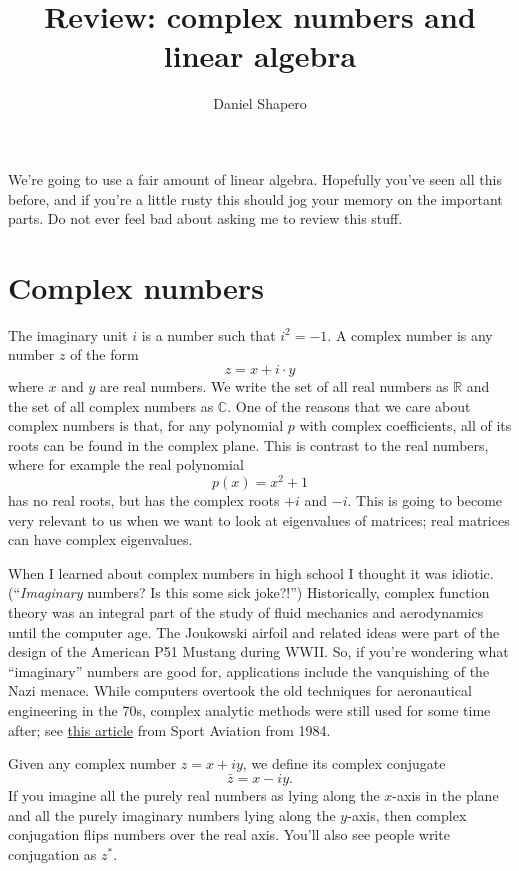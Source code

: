 \documentclass{article}
\title{Review: complex numbers and linear algebra}
\author{Daniel Shapero}
\date{}
\theoremstyle{definition}
\theoremstyle{plain}
\begin{document}
\maketitle

We're going to use a fair amount of linear algebra.
Hopefully you've seen all this before, and if you're a little rusty this should jog your memory on the important parts.
Do not ever feel bad about asking me to review this stuff.


\section{Complex numbers}

The imaginary unit $i$ is a number such that $i^2 = -1$.
A complex number is any number $z$ of the form
\begin{equation}
    z = x + i\cdot y
\end{equation}
where $x$ and $y$ are real numbers.
We write the set of all real numbers as $\mathbb{R}$ and the set of all complex numbers as $\mathbb{C}$.
One of the reasons that we care about complex numbers is that, for any polynomial $p$ with complex coefficients, all of its roots can be found in the complex plane.
This is contrast to the real numbers, where for example the real polynomial
\begin{equation}
    p(x) = x^2 + 1
\end{equation}
has no real roots, but has the complex roots $+i$ and $-i$.
This is going to become very relevant to us when we want to look at eigenvalues of matrices; real matrices can have complex eigenvalues.

When I learned about complex numbers in high school I thought it was idiotic.
(``\emph{Imaginary} numbers?
Is this some sick joke?!'')
Historically, complex function theory was an integral part of the study of fluid mechanics and aerodynamics until the computer age.
The Joukowski airfoil and related ideas were part of the design of the American P51 Mustang during WWII.
So, if you're wondering what ``imaginary'' numbers are good for, applications include the vanquishing of the Nazi menace.
While computers overtook the old techniques for aeronautical engineering in the 70s, complex analytic methods were still used for some time after; see \href{http://acversailles.free.fr/documentation/08%7EDocumentation_Generale_M_Suire/Aerodynamique/Profils/Theorie/Profil-Dessin/Design_your_own_airfoil.pdf}{this article} from Sport Aviation from 1984.

Given any complex number $z = x + iy$, we define its complex conjugate
\begin{equation}
    \bar z = x - iy.
\end{equation}
If you imagine all the purely real numbers as lying along the $x$-axis in the plane and all the purely imaginary numbers lying along the $y$-axis, then complex conjugation flips numbers over the real axis.
You'll also see people write conjugation as $z^*$.
\end{document}
